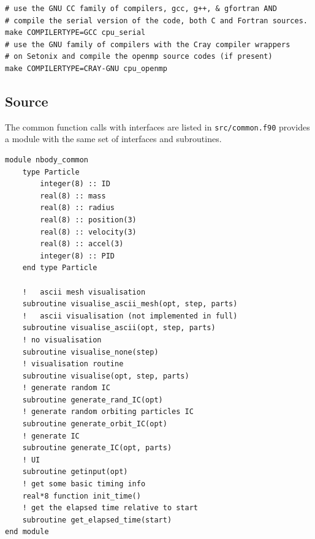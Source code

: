 \begin{center}
\begin{minipage}{0.95\textwidth}
\small
\begin{verbatim}
# use the GNU CC family of compilers, gcc, g++, & gfortran AND 
# compile the serial version of the code, both C and Fortran sources.
make COMPILERTYPE=GCC cpu_serial 
# use the GNU family of compilers with the Cray compiler wrappers 
# on Setonix and compile the openmp source codes (if present)
make COMPILERTYPE=CRAY-GNU cpu_openmp 
\end{verbatim}
\end{minipage}
\end{center}


\subsection{Source}
The common function calls with interfaces are listed in \texttt{src/common.f90} provides a module with the same set of interfaces and subroutines. 
\begin{center}
\begin{minipage}{0.95\textwidth}
\small
\begin{verbatim}
module nbody_common
    type Particle
        integer(8) :: ID
        real(8) :: mass
        real(8) :: radius
        real(8) :: position(3)
        real(8) :: velocity(3)
        real(8) :: accel(3)
        integer(8) :: PID
    end type Particle

    !   ascii mesh visualisation
    subroutine visualise_ascii_mesh(opt, step, parts)
    !   ascii visualisation (not implemented in full)
    subroutine visualise_ascii(opt, step, parts)
    ! no visualisation
    subroutine visualise_none(step)
    ! visualisation routine
    subroutine visualise(opt, step, parts)
    ! generate random IC
    subroutine generate_rand_IC(opt)
    ! generate random orbiting particles IC
    subroutine generate_orbit_IC(opt)
    ! generate IC
    subroutine generate_IC(opt, parts)
    ! UI
    subroutine getinput(opt)
    ! get some basic timing info
    real*8 function init_time()
    ! get the elapsed time relative to start
    subroutine get_elapsed_time(start)
end module
\end{verbatim}
\end{minipage}
\end{center}

